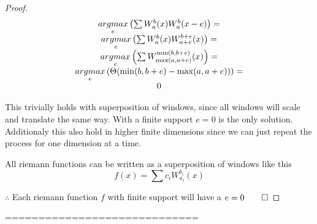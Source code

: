 \begin{proof}
\begin{equation}
\begin{array}{c}
            \underset{e}{argmax}\left(
                \sum
                    {
                        W_a^b(x)W_a^b(x-e)
                    }
                \right)
                =\\
            \underset{e}{argmax}\left(
                    \sum
                        {
                            W_a^b(x)W_
                                {
                                    a+e
                                }
                                ^
                                {
                                    b+e
                                }
                                (x)
                        }
                \right)
                =\\
            \underset{e}{argmax}\left(
                    \sum
                        {
                            W_
                                {
                                    \max(a,a+e)
                                }^
                                {
                                    \min(b,b+e)
                                }
                                (x)
                        }
                 \right)
                =\\
            \underset{e}{argmax}\left(
                    \Theta(\min(b,b+e)-\max(a,a+e))
                 \right)
                =\\
            0
        \end{array}
      \end{equation}

    This trivially holds with superposition of windows, since all windows will scale and translate the same way. 
    With a finite support $e=0$ is the only solution. Additionaly this also hold in higher finite dimensions since we can just repeat the process for one dimension at a time.
    
    All riemann functions can be written as a superposition of windows like this
    \begin{equation}
        f(x)=\sum{c_iW_{a_i}^{b_i}(x)}
    \end{equation}

    $\therefore$ Each riemann function $f$ with finite support will have a $e=0\qed$

\end{proof}

=============================

